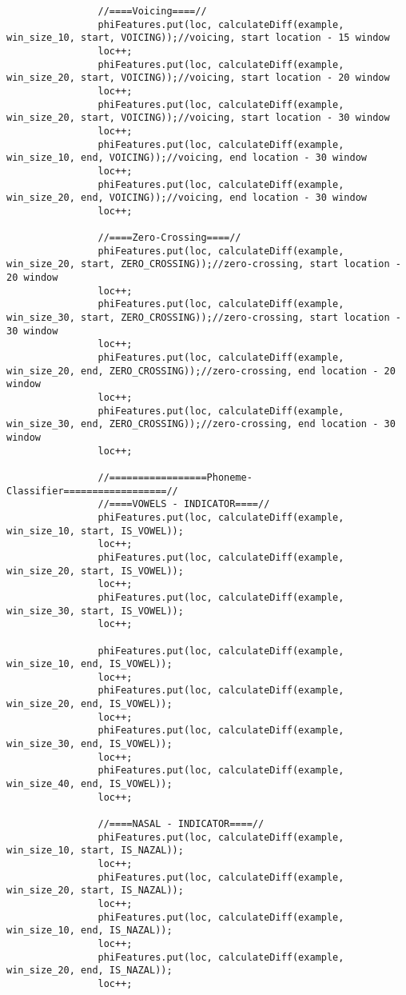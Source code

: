 \documentclass[11pt, oneside]{article}   	%
\begin{document}
\begin{lstlisting}
                //====Voicing====//
                phiFeatures.put(loc, calculateDiff(example, win_size_10, start, VOICING));//voicing, start location - 15 window
                loc++;
                phiFeatures.put(loc, calculateDiff(example, win_size_20, start, VOICING));//voicing, start location - 20 window
                loc++;
                phiFeatures.put(loc, calculateDiff(example, win_size_20, start, VOICING));//voicing, start location - 30 window
                loc++;
                phiFeatures.put(loc, calculateDiff(example, win_size_10, end, VOICING));//voicing, end location - 30 window
                loc++;
                phiFeatures.put(loc, calculateDiff(example, win_size_20, end, VOICING));//voicing, end location - 30 window
                loc++;

                //====Zero-Crossing====//
                phiFeatures.put(loc, calculateDiff(example, win_size_20, start, ZERO_CROSSING));//zero-crossing, start location - 20 window
                loc++;
                phiFeatures.put(loc, calculateDiff(example, win_size_30, start, ZERO_CROSSING));//zero-crossing, start location - 30 window
                loc++;
                phiFeatures.put(loc, calculateDiff(example, win_size_20, end, ZERO_CROSSING));//zero-crossing, end location - 20 window
                loc++;
                phiFeatures.put(loc, calculateDiff(example, win_size_30, end, ZERO_CROSSING));//zero-crossing, end location - 30 window
                loc++;

                //=================Phoneme-Classifier==================//
                //====VOWELS - INDICATOR====//
                phiFeatures.put(loc, calculateDiff(example, win_size_10, start, IS_VOWEL));
                loc++;
                phiFeatures.put(loc, calculateDiff(example, win_size_20, start, IS_VOWEL));
                loc++;
                phiFeatures.put(loc, calculateDiff(example, win_size_30, start, IS_VOWEL));
                loc++;

                phiFeatures.put(loc, calculateDiff(example, win_size_10, end, IS_VOWEL));
                loc++;
                phiFeatures.put(loc, calculateDiff(example, win_size_20, end, IS_VOWEL));
                loc++;
                phiFeatures.put(loc, calculateDiff(example, win_size_30, end, IS_VOWEL));
                loc++;
                phiFeatures.put(loc, calculateDiff(example, win_size_40, end, IS_VOWEL));
                loc++;

                //====NASAL - INDICATOR====//
                phiFeatures.put(loc, calculateDiff(example, win_size_10, start, IS_NAZAL));
                loc++;
                phiFeatures.put(loc, calculateDiff(example, win_size_20, start, IS_NAZAL));
                loc++;
                phiFeatures.put(loc, calculateDiff(example, win_size_10, end, IS_NAZAL));
                loc++;
                phiFeatures.put(loc, calculateDiff(example, win_size_20, end, IS_NAZAL));
                loc++;


\end{lstlisting}
\end{document}
